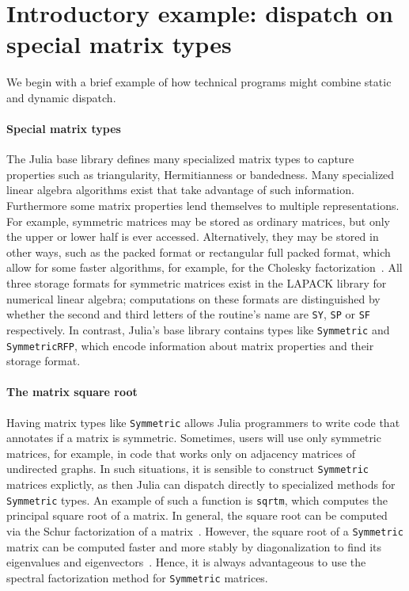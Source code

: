 \section{Introductory example: dispatch on special matrix types}

We begin with a brief example of how technical programs might combine static
and dynamic dispatch.

\paragraph{Special matrix types}
The Julia base library defines
many specialized matrix types to capture properties
such as triangularity, Hermitianness or bandedness. Many specialized
linear algebra algorithms exist that take advantage of such information.
Furthermore some matrix properties lend themselves to multiple representations.
For example, symmetric matrices may be stored as ordinary matrices, but only
the upper or lower half is ever accessed. Alternatively, they may be stored in
other ways, such as the packed format or rectangular full packed format, which
allow for some faster algorithms, for example, for the Cholesky
factorization~\cite{Gustavson2010}. All three storage formats for symmetric
matrices exist in the LAPACK library for numerical linear algebra; computations
on these formats are distinguished by whether the second and third letters of
the routine's name are \lstinline|SY|, \lstinline|SP| or \lstinline|SF|
respectively. In contrast, Julia's base library contains types like
\lstinline|Symmetric| and \lstinline|SymmetricRFP|, which encode information
about matrix properties and their storage format.

\paragraph{The matrix square root}
Having matrix types like \lstinline|Symmetric| allows Julia programmers to
write code that annotates if a matrix is symmetric. Sometimes, users
will use only symmetric matrices, for example, in code that
works only on adjacency matrices of undirected graphs. In such situations,
it is sensible to construct \lstinline|Symmetric| matrices explictly, as then
Julia can dispatch directly to specialized methods for \lstinline|Symmetric|
types. An example of such a function is \lstinline|sqrtm|, which computes the
principal square root of a matrix. In general, the square root can be computed
via the Schur factorization of a matrix~\cite{Golub2013}. However, the square
root of a \lstinline|Symmetric| matrix can be computed faster and more stably
by diagonalization to find its eigenvalues and
eigenvectors~\cite{Higham2008,Golub2013}. Hence, it is always advantageous to
use the spectral factorization method for \lstinline|Symmetric| matrices.

